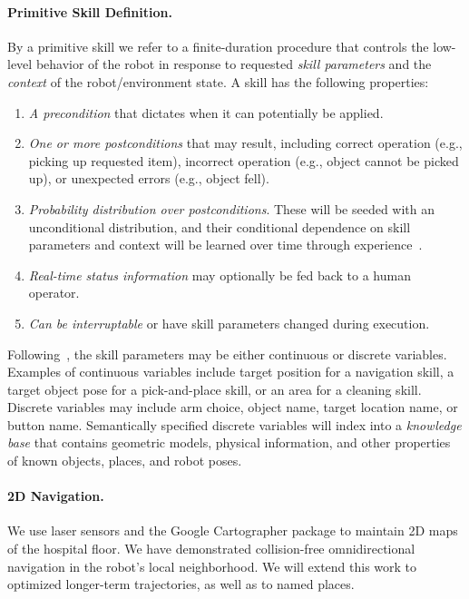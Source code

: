 \paragraph{Primitive Skill Definition.} 
 By a primitive skill we refer to a finite-duration procedure that controls the low-level behavior of the robot in response to requested {\em skill parameters} and the {\em context} of the robot/environment state.  A skill has the following properties:
\begin{enumerate}
\item {\em A precondition} that dictates when it can potentially be applied.
\item {\em One or more postconditions} that may result, including correct operation (e.g., picking up requested item), incorrect operation (e.g., object cannot be picked up), or unexpected errors (e.g., object fell).
\item {\em Probability distribution over postconditions}.  These will be seeded with an unconditional distribution, and their conditional dependence on skill parameters and context will be learned over time through experience~\cite{Pasula_learningprobabilistic2004}.
\item {\em Real-time status information} may optionally be fed back to a human operator.
\item {\em Can be interruptable} or have skill parameters changed during execution.
\end{enumerate}  

Following~\cite{HauserTAMP2010}, the skill parameters may be either continuous or discrete variables.  Examples of continuous variables include target position for a navigation skill, a target object pose for a pick-and-place skill, or an area for a cleaning skill.  Discrete variables may include arm choice, object name, target location name, or button name.  Semantically specified discrete variables will index into a {\em knowledge base} that contains geometric models, physical information, and other properties of known objects, places, and robot poses.

\paragraph{2D Navigation.}  We use laser sensors and the Google Cartographer package to maintain 2D maps of the hospital floor. We have demonstrated collision-free omnidirectional navigation in the robot's local neighborhood.  We will extend this work to optimized  longer-term trajectories, as well as to named places.

